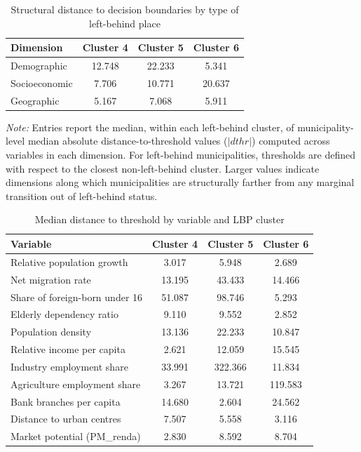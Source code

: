 \documentclass[a4paper,11pt,oneside]{article}
\begin{document}
\begin{table}[!ht]
\centering
\caption{Structural distance to decision boundaries by type of left-behind place}
\label{tab:structural_blocks}
\footnotesize
\begin{tabular}{lccc}
\toprule
\textbf{Dimension} & \textbf{Cluster 4} & \textbf{Cluster 5} & \textbf{Cluster 6} \\
\midrule
Demographic    & 12.748 & 22.233 & 5.341 \\
Socioeconomic  & 7.706  & 10.771 & 20.637 \\
Geographic  & 5.167  & 7.068  & 5.911 \\
\bottomrule
\end{tabular}

\vspace{0.2cm}
\begin{minipage}{0.9\linewidth}
\footnotesize
\textit{Note:} Entries report the median, within each left-behind cluster, of municipality-level median absolute distance-to-threshold values (\(|dthr|\)) computed across variables in each dimension. For left-behind municipalities, thresholds are defined with respect to the closest non-left-behind cluster. Larger values indicate dimensions along which municipalities are structurally farther from any marginal transition out of left-behind status.

\end{minipage}
\end{table}
\begin{table}[ht]
\centering
\caption{Median distance to threshold by variable and LBP cluster}
\label{tab:threshold_by_cluster}
\begin{tabular}{lccc}
\toprule
\textbf{Variable} & \textbf{Cluster 4} & \textbf{Cluster 5} & \textbf{Cluster 6} \\
\midrule
Relative population growth        & 3.017 & 5.948 & 2.689 \\
Net migration rate                & 13.195 & 43.433 & 14.466 \\
Share of foreign-born under 16    & 51.087 & 98.746 & 5.293 \\
Elderly dependency ratio          & 9.110 & 9.552 & 2.852 \\
Population density                & 13.136 & 22.233 & 10.847 \\
Relative income per capita        & 2.621 & 12.059 & 15.545 \\
Industry employment share         & 33.991 & 322.366 & 11.834 \\
Agriculture employment share      & 3.267 & 13.721 & 119.583 \\
Bank branches per capita          & 14.680 & 2.604 & 24.562 \\
Distance to urban centres         & 7.507 & 5.558 & 3.116 \\
Market potential (PM\_renda)      & 2.830 & 8.592 & 8.704 \\
\bottomrule
\end{tabular}
\end{table}
\end{document}
